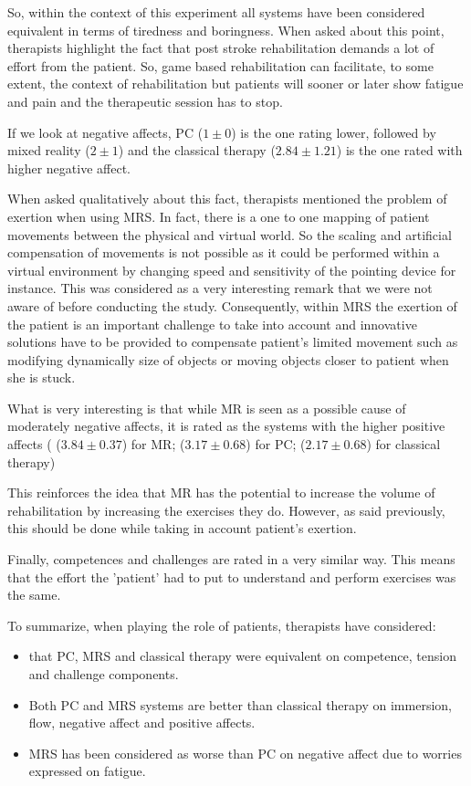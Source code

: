 \documentclass[preprint,authoryear,12pt]{elsarticle}
\begin{document}
So, within the context of this experiment all systems have been considered equivalent in terms of tiredness and boringness. When asked about this point, therapists highlight the fact that post stroke rehabilitation demands a lot of effort from the patient. So, game based rehabilitation can facilitate, to some extent, the context of rehabilitation but patients will sooner or later show fatigue and pain and the therapeutic session has to stop.

If we look at negative affects, PC ($1 \pm 0$) is the one rating lower, followed by mixed reality ($2 \pm 1$) and the classical therapy ($2.84 \pm 1.21$) is the one rated with higher negative affect. 

When asked qualitatively about this fact, therapists mentioned the problem of exertion when using MRS. In fact, there is a one to one mapping of patient movements between the physical and virtual world. So the scaling and artificial compensation of movements is not possible as it could be performed within a virtual environment by changing speed and sensitivity of the pointing device for instance. This was considered as a very interesting remark that we were not aware of before conducting the study. Consequently, within MRS the exertion of the patient is an important challenge to take into account and innovative solutions have to be provided to compensate patient's limited movement such as modifying dynamically size of objects or moving objects closer to patient when she is stuck. 
 

What is very interesting is that while MR is seen as a possible cause of moderately negative affects, it is rated as the systems with the higher positive affects ( ($3.84 \pm 0.37$) for MR; ($3.17 \pm 0.68$) for PC;  ($2.17 \pm 0.68$) for classical therapy)

This reinforces the idea that MR has the potential to increase the volume of rehabilitation by increasing the exercises they do. However, as said previously, this should be done while taking in account patient's exertion.

Finally, competences and challenges are rated in a very similar way. This means that the effort the 'patient' had to put to understand and perform exercises was the same. 

To summarize, when playing the role of patients, therapists have considered:
 \begin{itemize}
\item that PC, MRS and classical therapy were equivalent on competence, tension and challenge components.
\item Both PC and MRS systems are better than classical therapy on immersion, flow, negative affect and positive affects.
\item MRS has been considered as worse than PC on negative affect due to worries expressed on fatigue. 
\end{itemize}
\end{document}
